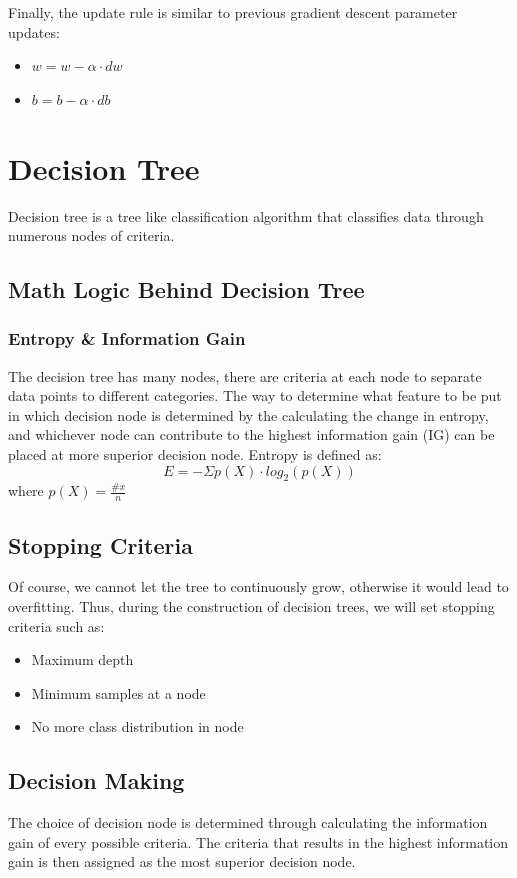 \documentclass[12pt]{article}
\begin{document}
Finally, the update rule is similar to previous gradient descent parameter updates:
\begin{itemize}
	\item $w = w - \alpha\cdot dw$
	\item $b = b - \alpha\cdot db$
\end{itemize}
\newpage

\section{Decision Tree}
Decision tree is a tree like classification algorithm that classifies data through numerous nodes of criteria.

\subsection{Math Logic Behind Decision Tree}
\subsubsection{Entropy \& Information Gain}
The decision tree has many nodes, there are criteria at each node to separate data points to different categories. The way to determine what feature to be put in which decision node is determined by the calculating the change in entropy, and whichever node can contribute to the highest information gain (IG) can be placed at more superior decision node. Entropy is defined as:
$$E = -\Sigma p(X)\cdot log_2(p(X))$$
where $p(X) = \frac{\# x}{n}$

\subsection{Stopping Criteria}
Of course, we cannot let the tree to continuously grow, otherwise it would lead to overfitting. Thus, during the construction of decision trees, we will set stopping criteria such as:
\begin{itemize}
	\item Maximum depth
	\item Minimum samples at a node
	\item No more class distribution in node
\end{itemize}

\subsection{Decision Making}
The choice of decision node is determined through calculating the information gain of every possible criteria. The criteria that results in the highest information gain is then assigned as the most superior decision node.
\end{document}
